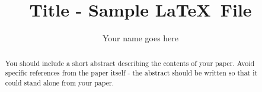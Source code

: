 \documentclass[10pt]{amsart}
\begin{document}
\parskip10pt
\parindent12pt
\baselineskip16pt






\def\G{\widetilde{G}}
\def\B{\widetilde{B}}
\def\T{\widetilde{T}}
\def\C{\mathbb{C}}
\def\A{\mathbb{A}}
\def\Z{\mathbb{Z}}
\def\R{\mathbb{R}}
\def\Q{\mathbb{Q}}
\def\N{\mathbb{N}}
\def\C{\mathbb{C}}
\def\F{\mathbb{F}}
\def\I{\mathbb{I}}
\def\H{\mathcal{H}}
\def\e{\varepsilon}
\def\s{\underline s}
\def\z{\zeta }
\def\vp{\varpi }
\def\O{\mathcal O}
\def\v{\upsilon }
\def\U{\Upsilon }
\def\p{\wp }
\def\p{\mathfrak{p}}
\def\B{\mathfrak{B}}

\newtheorem{theorem}{Theorem}%
\newtheorem{lemma}[theorem]{Lemma}













\title{Title - Sample \LaTeX \ File}

\author{Your name goes here}




\begin{abstract}
You should include a short abstract describing the contents of your paper.  Avoid specific references from the paper itself - the abstract should be written so that it could stand alone from your paper.\end{abstract}
\end{document}
